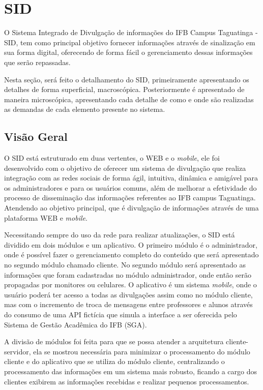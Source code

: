 \chapter[SID]{SID}
\label{cap:sid}
O Sistema Integrado de Divulgação de informações do IFB Campus Taguatinga - SID, tem como principal objetivo fornecer informações através de sinalização em sua forma digital, oferecendo de forma fácil o gerenciamento dessas informações que serão repassadas. 

Nesta seção, será feito o detalhamento do SID, primeiramente apresentando os detalhes de forma superficial, macroscópica. Posteriormente é apresentado de maneira microscópica, apresentando cada detalhe de como e onde são realizadas as demandas de cada elemento presente no sistema. 

\section{Visão Geral} 
O SID está estruturado em duas vertentes, o WEB e o \textit{mobile}, ele foi desenvolvido com o objetivo de oferecer um sistema de divulgação que realiza integração com as redes sociais de forma ágil, intuitiva, dinâmica e amigável para os administradores e para os usuários comuns, além de melhorar a efetividade do processo de disseminação das informações referentes ao IFB campus Taguatinga. Atendendo ao objetivo principal, que é divulgação de informações através de uma plataforma WEB e \textit{mobile}.

Necessitando sempre do uso da rede para realizar atualizações, o SID está dividido em dois módulos e um aplicativo. O primeiro módulo é o administrador, onde é possível fazer o gerenciamento completo do conteúdo que será apresentado no segundo módulo chamado cliente. No segundo módulo será apresentado as informações que foram cadastradas no módulo administrador, onde então serão propagadas por monitores ou celulares. O aplicativo é um sistema \textit{mobile}, onde o usuário poderá ter acesso a todas as divulgações assim como no módulo cliente, mas com o incremento de troca de mensagens entre professores e alunos através do consumo de uma API fictícia que simula a interface a ser oferecida pelo Sistema de Gestão Acadêmica do IFB (SGA).

A divisão de módulos foi feita para que se possa atender a arquitetura cliente-servidor, ela se mostrou necessária para minimizar o processamento do módulo cliente e do aplicativo que se utiliza do módulo cliente, centralizando o processamento das informações em um sistema mais robusto, ficando a cargo dos clientes exibirem as informações recebidas e realizar pequenos processamentos.

